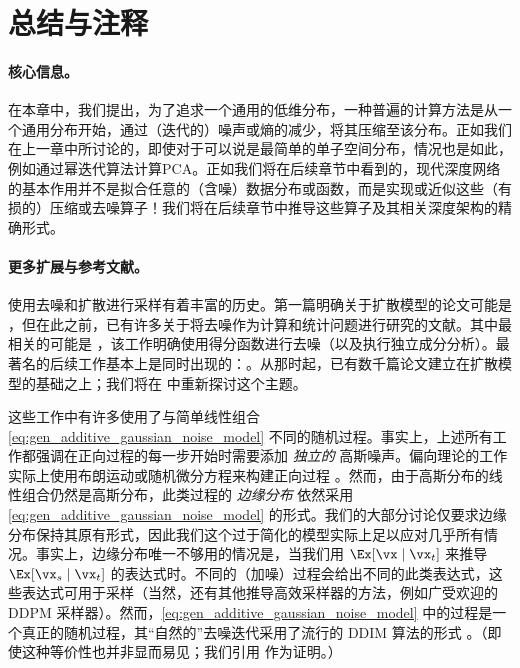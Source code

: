\documentclass[../../book-main_zh.tex]{subfiles}
\begin{document}

\section{总结与注释}
\paragraph{核心信息。}
在本章中，我们提出，为了追求一个通用的低维分布，一种普遍的计算方法是从一个通用分布开始，通过（迭代的）噪声或熵的减少，将其压缩至该分布。正如我们在上一章中所讨论的，即使对于可以说是最简单的单子空间分布，情况也是如此，例如通过幂迭代算法计算PCA。正如我们将在后续章节中看到的，现代深度网络的基本作用并不是拟合任意的（含噪）数据分布或函数，而是实现或近似这些（有损的）压缩或去噪算子！我们将在后续章节中推导这些算子及其相关深度架构的精确形式。

\paragraph{更多扩展与参考文献。}
使用去噪和扩散进行采样有着丰富的历史。第一篇明确关于扩散模型的论文可能是 \cite{Sohl-Dickstein2015}，但在此之前，已有许多关于将去噪作为计算和统计问题进行研究的文献。其中最相关的可能是 \cite{hyvarinen05a}，该工作明确使用得分函数进行去噪（以及执行独立成分分析）。最著名的后续工作基本上是同时出现的：\cite{ho2020denoising,song2019}。从那时起，已有数千篇论文建立在扩散模型的基础之上；我们将在  中重新探讨这个主题。

这些工作中有许多使用了与简单线性组合 \eqref{eq:gen_additive_gaussian_noise_model} 不同的随机过程。事实上，上述所有工作都强调在正向过程的每一步开始时需要添加 \textit{独立的} 高斯噪声。偏向理论的工作实际上使用布朗运动或随机微分方程来构建正向过程 \cite{song2020score}。然而，由于高斯分布的线性组合仍然是高斯分布，此类过程的 \textit{边缘分布} 依然采用 \eqref{eq:gen_additive_gaussian_noise_model} 的形式。我们的大部分讨论仅要求边缘分布保持其原有形式，因此我们这个过于简化的模型实际上足以应对几乎所有情况。事实上，边缘分布唯一不够用的情况是，当我们用 \(\Ex[\vx \mid \vx_{t}]\) 来推导 \(\Ex[\vx_{s} \mid \vx_{t}]\) 的表达式时。不同的（加噪）过程会给出不同的此类表达式，这些表达式可用于采样（当然，还有其他推导高效采样器的方法，例如广受欢迎的 DDPM 采样器）。然而，\eqref{eq:gen_additive_gaussian_noise_model} 中的过程是一个真正的随机过程，其“自然的”去噪迭代采用了流行的 DDIM 算法的形式 \cite{song2020denoising}。（即使这种等价性也并非显而易见；我们引用 \cite{de2025distributional} 作为证明。）
\end{document}
